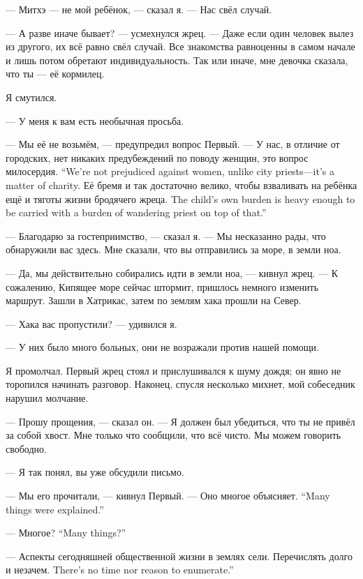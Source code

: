 --- Митхэ --- не мой ребёнок, --- сказал я.
--- Нас свёл случай.

--- А разве иначе бывает? --- усмехнулся жрец.
--- Даже если один человек вылез из другого, их всё равно свёл случай.
Все знакомства равноценны в самом начале и лишь потом обретают индивидуальность.
Так или иначе, мне девочка сказала, что ты --- её кормилец.

Я смутился.

--- У меня к вам есть необычная просьба.

--- Мы её не возьмём, --- предупредил вопрос Первый.
{--- У нас, в отличие от городских, нет никаких предубеждений по поводу женщин, это вопрос милосердия.}
{``We're not prejudiced against women, unlike city priests---it's a matter of charity.}
{Её бремя и так достаточно велико, чтобы взваливать на ребёнка ещё и тяготы жизни бродячего жреца.}
{The child's own burden is heavy enough to be carried with a burden of wandering priest on top of that.''}

--- Благодарю за гостеприимство, --- сказал я.
--- Мы несказанно рады, что обнаружили вас здесь.
Мне сказали, что вы отправились за море, в земли ноа.

--- Да, мы действительно собирались идти в земли ноа, --- кивнул жрец.
--- К сожалению, Кипящее море сейчас штормит, пришлось немного изменить маршрут.
Зашли в Хатрикас, затем по землям хака прошли на Север.

--- Хака вас пропустили? --- удивился я.

--- У них было много больных, они не возражали против нашей помощи.

Я промолчал.
Первый жрец стоял и прислушивался к шуму дождя;
он явно не торопился начинать разговор.
Наконец, спусля несколько михнет, мой собеседник нарушил молчание.

--- Прошу прощения, --- сказал он.
--- Я должен был убедиться, что ты не привёл за собой хвост.
Мне только что сообщили, что всё чисто.
Мы можем говорить свободно.

--- Я так понял, вы уже обсудили письмо.

--- Мы его прочитали, --- кивнул Первый.
{--- Оно многое объясняет.}
{``Many things were explained.''}

{--- Многое?}
{``Many things?''}

--- Аспекты сегодняшней общественной жизни в землях сели.
{Перечислять долго и незачем.}
{There's no time nor reason to enumerate.''}

